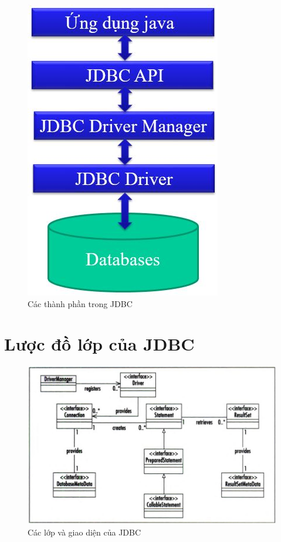 \begin{figure}[!ht]
	\centering
	\includegraphics[scale=0.7]{Figures//Hinh31.jpg}
	\caption{ Các thành phần trong JDBC }\label{hinh31} 
\end{figure}
\section{Lược đồ lớp của JDBC}
\begin{figure}[!ht]
	\centering
	\includegraphics[scale=0.65]{Figures//Hinh32.jpg}
	\caption{ Các lớp và giao diện của JDBC }\label{hinh32} 
\end{figure}

